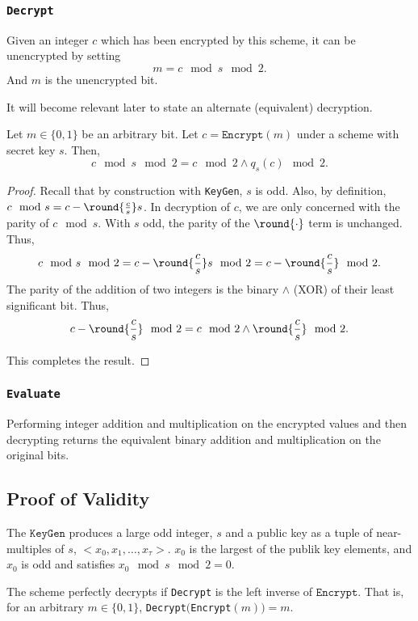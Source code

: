 \documentclass[a4paper,11pt, oneside]{article}
\begin{document}
\subsubsection{\texttt{Decrypt}}
Given an integer $c$ which has been encrypted by this scheme, it can be unencrypted by setting
\[m = c\mod{s}\mod{2}.\]
And $m$ is the unencrypted bit.

It will become relevant later to state an alternate (equivalent) decryption.

\begin{lemma}
    Let $m\in\{0,1\}$ be an arbitrary bit.  Let $c = \texttt{Encrypt}(m)$ under a scheme with secret key $s$.  Then, 
    \[
        c\mod{s}\mod{2} = c\mod{2} \wedge q_s(c)\mod{2}.\]
    \label{lem:alt}
\end{lemma}
\begin{proof}
    Recall that by construction with \texttt{KeyGen}, $s$ is odd.  Also, by definition, $c\mod{s} = c - \round{\frac{c}{s}}s$.  In decryption of $c$, we are only concerned with the parity of $c\mod{s}$.  With $s$ odd, the parity of the $\round{\cdot}$ term is unchanged.  Thus,
    \[c\mod{s}\mod{2} = c - \round{\frac{c}{s}}s\mod{2} = c - \round{\frac{c}{s}}\mod{2}.\]
    The parity of the addition of two integers is the binary $\wedge$ (XOR) of their least significant bit.  Thus,
    \[c - \round{\frac{c}{s}}\mod{2} = c\mod{2} \wedge \round{\frac{c}{s}}\mod{2}.\]

    This completes the result.
\end{proof}

\subsubsection{\texttt{Evaluate}}
Performing integer addition and multiplication on the encrypted values and then decrypting returns the equivalent binary addition and multiplication on the original bits.

\subsection{Proof of Validity}\label{sec:proof}
The $\texttt{KeyGen}$ produces a large odd integer, $s$ and a public key as a tuple of near-multiples of $s$, $<x_0,x_1,\dots,x_\tau>$.  $x_0$ is the largest of the publik key elements, and $x_0$ is odd and satisfies $x_0\mod{s}\mod{2} = 0$.


The scheme perfectly decrypts if \texttt{Decrypt} is the left inverse of $\texttt{Encrypt}$.  That is, for an arbitrary $m\in\{0,1\}$, \texttt{Decrypt}$($\texttt{Encrypt}$(m)) = m$.
\end{document}
